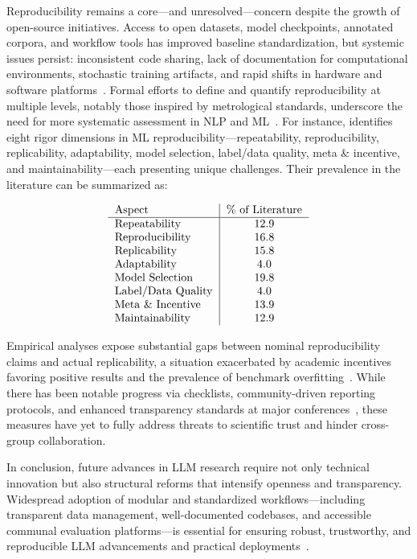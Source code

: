 \documentclass[sigconf]{acmart}
\begin{document}
Reproducibility remains a core—and unresolved—concern despite the growth of open-source initiatives. Access to open datasets, model checkpoints, annotated corpora, and workflow tools has improved baseline standardization, but systemic issues persist: inconsistent code sharing, lack of documentation for computational environments, stochastic training artifacts, and rapid shifts in hardware and software platforms~\cite{ref74,ref75,ref80,ref81,ref83,ref85,ref86,ref87,ref91}. Formal efforts to define and quantify reproducibility at multiple levels, notably those inspired by metrological standards, underscore the need for more systematic assessment in NLP and ML~\cite{ref13,ref66,ref67}. For instance, \cite{ref67} identifies eight rigor dimensions in ML reproducibility—repeatability, reproducibility, replicability, adaptability, model selection, label/data quality, meta \& incentive, and maintainability—each presenting unique challenges. Their prevalence in the literature can be summarized as:

\[
\begin{tabular}{l|c}
Aspect & \% of Literature \\
\hline
Repeatability & 12.9 \\
Reproducibility & 16.8 \\
Replicability & 15.8 \\
Adaptability & 4.0 \\
Model Selection & 19.8 \\
Label/Data Quality & 4.0 \\
Meta \& Incentive & 13.9 \\
Maintainability & 12.9 \\
\end{tabular}
\]

Empirical analyses expose substantial gaps between nominal reproducibility claims and actual replicability, a situation exacerbated by academic incentives favoring positive results and the prevalence of benchmark overfitting~\cite{ref61,ref79,ref82,ref85,ref87,ref91}. While there has been notable progress via checklists, community-driven reporting protocols, and enhanced transparency standards at major conferences~\cite{ref33,ref81,ref83,ref84}, these measures have yet to fully address threats to scientific trust and hinder cross-group collaboration.

In conclusion, future advances in LLM research require not only technical innovation but also structural reforms that intensify openness and transparency. Widespread adoption of modular and standardized workflows—including transparent data management, well-documented codebases, and accessible communal evaluation platforms—is essential for ensuring robust, trustworthy, and reproducible LLM advancements and practical deployments~\cite{ref81,ref82,ref83,ref86,ref91}.
\end{document}
